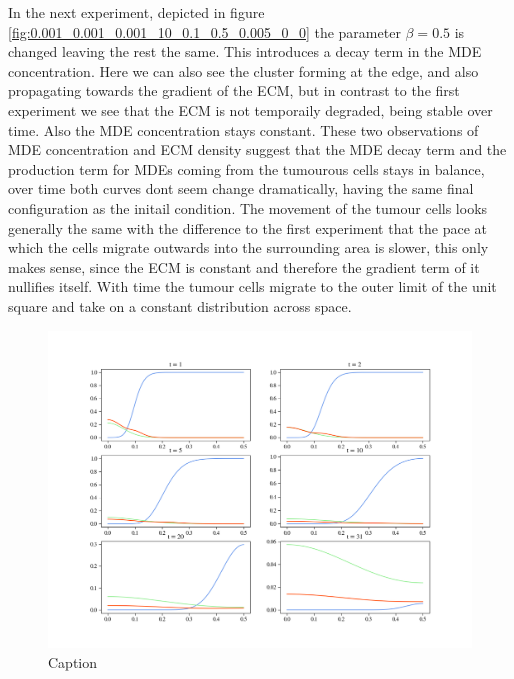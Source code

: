 In the next experiment, depicted in figure \ref{fig:0.001_0.001_0.001_10_0.1_0.5_0.005_0_0} the parameter $\beta = 0.5$ is changed leaving the rest the same. This introduces a decay term in the MDE concentration. Here we can also see the cluster forming at the edge, and also propagating towards the gradient of the ECM, but in contrast to the first experiment we see that the ECM is not temporaily degraded, being stable over time. Also the MDE concentration stays constant. These two observations of MDE concentration and ECM density suggest that the MDE decay term and the production term for MDEs coming from the tumourous cells stays in balance, over time both curves dont seem change dramatically, having the same final configuration as the initail condition. The movement of the tumour cells looks generally the same with the difference to the first experiment that the pace at which the cells migrate outwards into the surrounding area is slower, this only makes sense, since the ECM is constant and therefore the gradient term of it nullifies itself. With time the tumour cells migrate to the outer limit of the unit square and take on a constant distribution across space. 
\begin{figure}
    \centering
    \includegraphics[width=\textwidth]{resources/images/0.001_0.001_0.001_20_0.1_0_0.002_0_0.png}
    \caption{Caption}
    \label{fig:0.001_0.001_0.001_20_0.1_0_0.002_0_0}
\end{figure}

